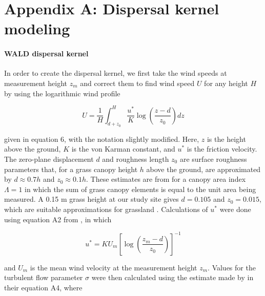 \documentclass[11pt]{article}\usepackage[]{graphicx}\usepackage[]{color}
\begin{document}
\newpage
\section*{Appendix A: Dispersal kernel modeling}
\renewcommand{\thefigure}{A\arabic{figure}}\setcounter{figure}{0}
\renewcommand{\thetable}{A\arabic{table}}\setcounter{table}{0}
\renewcommand{\theequation}{A\arabic{equation}}\setcounter{equation}{0}

\paragraph{WALD dispersal kernel}
In order to create the dispersal kernel, we first take the wind speeds at measurement height $z_{m}$ and correct them to find wind speed $U$ for any height $H$ by using the logarithmic wind profile

\begin{linenomath*} \begin{equation} U = \frac{1}{H} \int_{d+z_{0}}^{H} \frac{u^*}{K} \log \left(\frac{z-d}{z_{0}}\right) dz \end{equation} 
\end{linenomath*} 

given in \citet{bullock2012modelling} equation 6, with the notation slightly modified. 
Here, $z$ is the height above the ground, $K$ is the von Karman constant, and $u^*$ is the friction velocity.
The zero-plane displacement $d$ and roughness length $z_{0}$ are surface roughness parameters that, for a grass canopy height $h$ above the ground, are  approximated by $d \approx 0.7h$ and $z_{0} \approx 0.1h$.
These estimates are from \citet{raupach1994simplified} for a canopy area index $\Lambda = 1$ in which the sum of grass canopy elements is equal to the unit area being measured.
A 0.15 m grass height at our study site gives $d = 0.105$ and $z_{0} = 0.015$, which are suitable approximations for grassland \citep{wiernga1993representative}.
Calculations of $u^*$ were done using equation A2 from \citet{skarpaas2007dispersal}, in which 

\begin{linenomath*} \begin{equation} u^* = KU_{m} \left[\log\left(\frac{z_{m} - d}{z_{0}}\right)\right]^{-1} \end{equation} 
\end{linenomath*} 

and $U_{m}$ is the mean wind velocity at the measurement height $z_{m}$.
Values for the turbulent flow parameter $\sigma$ were then calculated using the estimate made by \citet{skarpaas2007dispersal} in their equation A4, where 
\end{document}
